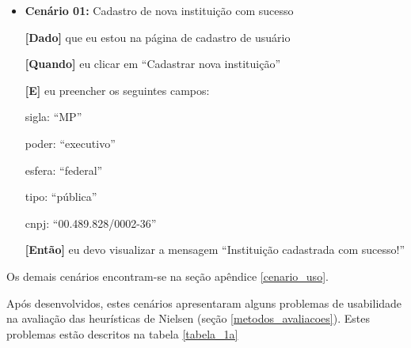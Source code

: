 \begin{itemize}
\item\textbf{Cenário 01:} Cadastro de nova instituição com sucesso

\textbf{[Dado]} que eu estou na página de cadastro de usuário

\textbf{[Quando]} eu clicar em ``Cadastrar nova instituição''

\textbf{[E]} eu preencher os seguintes campos:

  	\subitem sigla: ``MP''

  	\subitem poder: ``executivo''

  	\subitem esfera: ``federal''

  	\subitem tipo: ``pública''

  	\subitem cnpj: ``00.489.828/0002-36''

\textbf{[Então]} eu devo visualizar a mensagem ``Instituição cadastrada com sucesso!''
\end{itemize}
Os demais cenários encontram-se na seção apêndice \ref{cenario_uso}. 

Após desenvolvidos, estes cenários apresentaram alguns problemas de usabilidade na avaliação das heurísticas de Nielsen (seção \ref{metodos_avaliacoes}). Estes problemas estão descritos na tabela \ref{tabela_1a}

